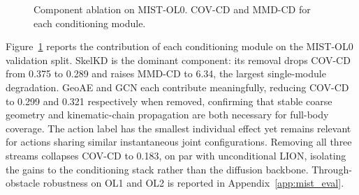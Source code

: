 \documentclass{article}
\begin{document}
\begin{figure}[t]
\caption{
  Component ablation on MIST-OL0.
  COV-CD and MMD-CD for each conditioning module.
}
\label{fig:ablation}
\end{figure}

Figure~\ref{fig:ablation} reports the contribution of each conditioning module
on the MIST-OL0 validation split.
SkelKD is the dominant component: its removal drops COV-CD from 0.375 to 0.289
and raises MMD-CD to 6.34, the largest single-module degradation.
GeoAE and GCN each contribute meaningfully, reducing COV-CD to 0.299 and 0.321
respectively when removed, confirming that stable coarse geometry and kinematic-chain
propagation are both necessary for full-body coverage.
The action label has the smallest individual effect yet remains relevant for actions
sharing similar instantaneous joint configurations.
Removing all three streams collapses COV-CD to 0.183, on par with unconditional LION,
isolating the gains to the conditioning stack rather than the diffusion backbone.
Through-obstacle robustness on OL1 and OL2 is reported in Appendix~\ref{app:mist_eval}.
\end{document}
